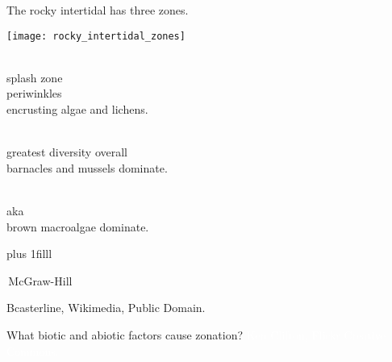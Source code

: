 \documentclass[t]{beamer}
\begin{document}
\begin{frame}[t]{The rocky intertidal has three zones.}

\vspace*{-\baselineskip}

\begin{multicols}{2}

	\begin{center}
		\texttt{[image: rocky\_intertidal\_zones]}
	\end{center}

\columnbreak

	\hangpara{}\\
	\hspace*{1em}splash zone\\
	\hspace*{1em}periwinkles\\
	\hspace*{1em}encrusting algae and lichens.
	

	\hangpara{}\\
	\hspace*{1em}greatest diversity overall\\
	\hspace*{1em}barnacles and mussels dominate.

	\hangpara{}\\
	\hspace*{1em}aka \\
	\hspace*{1em}brown macroalgae dominate.

\end{multicols}

	\vskip0pt plus 1filll

	\tiny\textcopyright\,McGraw-Hill

\end{frame}

{
\begin{frame}[b]{}
\hfill\tiny Bcasterline, Wikimedia, Public Domain.
\end{frame}
}


{
\begin{frame}[b]{What biotic and abiotic factors cause zonation?}
\tiny\textcolor{white}{Ken Clifton, Flickr Creative Commons.}
\end{frame}
}
\end{document}
